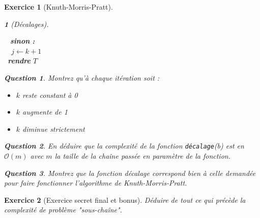 \documentclass{article}
\theoremstyle{exostyle}
\newtheorem{exo}{Exercice}
\theoremstyle{partiestyle}
\newtheorem{partie}{}[exo]
\theoremstyle{questionstyle}
\newtheorem{questionpartie}{Question}[partie]
\begin{document}
\begin{exo}[Knuth-Morris-Pratt]
\begin{partie}[Décalages]
\begin{tabbing}
            \>\vline$\,$\>\vline$\,$\>\vline$\,$ \textbf{sinon} {\bf :}\\
            \>\vline$\,$\>\vline$\,$\>\vline$\,$\>\vline$\,$ $j \leftarrow k + 1$\\
            \>\vline$\,$ \textbf{rendre} $T$\\
        \end{tabbing}
        \begin{questionpartie}
            Montrez qu'à chaque itération soit :
            \begin{itemize}
                \item $k$ reste constant à 0
                \item $k$ augmente de 1
                \item $k$ diminue strictement
            \end{itemize}
        \end{questionpartie}
        \begin{questionpartie}
            En déduire que la complexité de la fonction \texttt{décalage}(b) est en $\mathcal{O}(m)$ avec $m$ la taille de la chaîne passée en paramètre de la fonction.
        \end{questionpartie}
        \begin{questionpartie}
            Montrez que la fonction décalage correspond bien à celle demandée pour faire fonctionner l'algorithme de Knuth-Morris-Pratt.
        \end{questionpartie}
    \end{partie}
\end{exo}
\begin{exo}[Exercice secret final et bonus]
    Déduire de tout ce qui précède la complexité de problème "sous-chaîne".
\end{exo}
\end{document}
